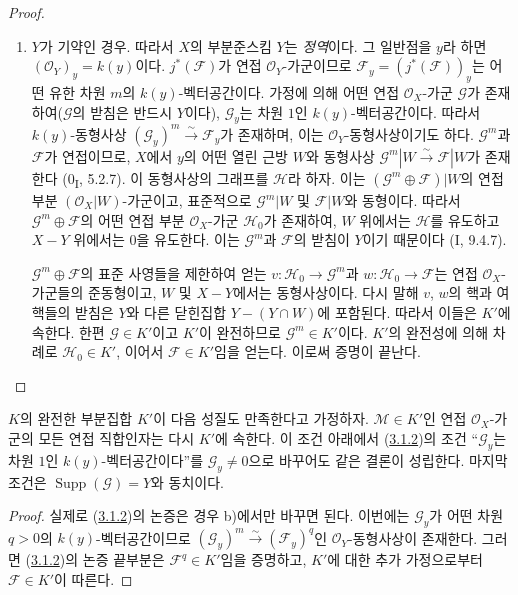 \begin{proof}
\begin{enumerate}
\item[b)] $Y$가 기약인 경우. 따라서 $X$의 부분준스킴 $Y$는
\emph{정역}이다. 그 일반점을 $y$라 하면
$(\mathcal O_Y)_y=k(y)$이다. $j^*(\mathcal F)$가 연접
$\mathcal O_Y$-가군이므로
$\mathcal F_y=(j^*(\mathcal F))_y$는 어떤 유한 차원 $m$의
$k(y)$-벡터공간이다. 가정에 의해 어떤 연접 $\mathcal O_X$-가군
$\mathcal G$가 존재하여($\mathcal G$의 받침은 반드시 $Y$이다),
$\mathcal G_y$는 차원 $1$인 $k(y)$-벡터공간이다. 따라서
$k(y)$-동형사상
$(\mathcal G_y)^m\xrightarrow{\sim}\mathcal F_y$가 존재하며, 이는
$\mathcal O_Y$-동형사상이기도 하다. $\mathcal G^m$과 $\mathcal F$가
연접이므로, $X$에서 $y$의 어떤 열린 근방 $W$와 동형사상
$\mathcal G^m|W\xrightarrow{\sim}\mathcal F|W$가 존재한다
(0\textsubscript{I}, 5.2.7). 이 동형사상의 그래프를 $\mathcal H$라
하자. 이는 $(\mathcal G^m\oplus\mathcal F)|W$의 연접 부분
$(\mathcal O_X|W)$-가군이고, 표준적으로 $\mathcal G^m|W$ 및
$\mathcal F|W$와 동형이다. 따라서 $\mathcal G^m\oplus\mathcal F$의
어떤 연접 부분 $\mathcal O_X$-가군 $\mathcal H_0$가 존재하여,
$W$ 위에서는 $\mathcal H$를 유도하고 $X-Y$ 위에서는 0을 유도한다.
이는 $\mathcal G^m$과 $\mathcal F$의 받침이 $Y$이기 때문이다
(I, 9.4.7).

$\mathcal G^m\oplus\mathcal F$의 표준 사영들을 제한하여 얻는
$v:\mathcal H_0\to\mathcal G^m$과
$w:\mathcal H_0\to\mathcal F$는 연접 $\mathcal O_X$-가군들의
준동형이고, $W$ 및 $X-Y$에서는 동형사상이다. 다시 말해 $v$, $w$의
핵과 여핵들의 받침은 $Y$와 다른 닫힌집합 $Y-(Y\cap W)$에 포함된다.
따라서 이들은 $K'$에 속한다. 한편 $\mathcal G\in K'$이고 $K'$이
완전하므로 $\mathcal G^m\in K'$이다. $K'$의 완전성에 의해 차례로
$\mathcal H_0\in K'$, 이어서 $\mathcal F\in K'$임을 얻는다. 이로써
증명이 끝난다.
\end{enumerate}
\end{proof}

\begin{corollary}[3.1.3]
\label{III.3.1.3-fr}
$K$의 완전한 부분집합 $K'$이 다음 성질도 만족한다고 가정하자.
$\mathcal M\in K'$인 연접 $\mathcal O_X$-가군의 모든 연접 직합인자는
다시 $K'$에 속한다. 이 조건 아래에서
(\hyperref[III.3.1.2-fr]{3.1.2})의 조건
``$\mathcal G_y$는 차원 $1$인 $k(y)$-벡터공간이다''를
$\mathcal G_y\neq0$으로 바꾸어도 같은 결론이 성립한다. 마지막 조건은
$\operatorname{Supp}(\mathcal G)=Y$와 동치이다.
\end{corollary}

\begin{proof}
실제로 (\hyperref[III.3.1.2-fr]{3.1.2})의 논증은 경우 b)에서만
바꾸면 된다. 이번에는 $\mathcal G_y$가 어떤 차원 $q>0$의
$k(y)$-벡터공간이므로
$(\mathcal G_y)^m\xrightarrow{\sim}(\mathcal F_y)^q$인
$\mathcal O_Y$-동형사상이 존재한다. 그러면
(\hyperref[III.3.1.2-fr]{3.1.2})의 논증 끝부분은
$\mathcal F^q\in K'$임을 증명하고, $K'$에 대한 추가 가정으로부터
$\mathcal F\in K'$이 따른다.
\end{proof}

